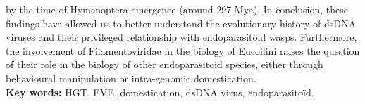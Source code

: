 by the time of Hymenoptera emergence (around 297 Mya). In conclusion, these findings have allowed us to better understand the evolutionary history of dsDNA viruses and their privileged relationship with endoparasitoid wasps. Furthermore, the involvement of Filamentoviridae in the biology of Eucoilini raises the question of their role in the biology of other endoparasitoid species, either through behavioural manipulation or intra-genomic domestication.\\

\textbf{Key words:} HGT, EVE, domestication, dsDNA virus, endoparasitoïd.








